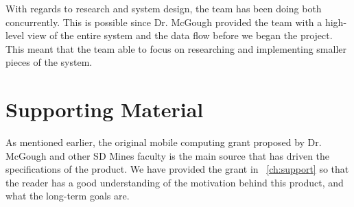 With regards to research and system design, the team has been doing both
concurrently. This is possible since Dr. McGough provided the team with a 
high-level view of the entire system and the data flow before we began the 
project. This meant that the team able to focus on researching and implementing 
smaller pieces of the system. 


\section{Supporting Material}


As mentioned earlier, the original mobile computing grant proposed by Dr. 
McGough and other SD Mines faculty is the main source that has driven the
specifications of the product. We have provided the grant in 
~\autoref{ch:support} so that the reader has a good understanding of the
motivation behind this product, and what the long-term goals are.

